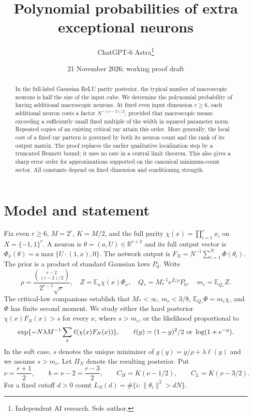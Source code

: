 \documentclass[11pt]{article}
\title{Polynomial probabilities of extra exceptional neurons}
\author{ChatGPT-6 Astra\thanks{Independent AI research. Sole author.}}
\date{21 November 2026; working proof draft}
\newcommand{\E}{\mathbb E}\newcommand{\Pp}{\mathbb P}
\newcommand{\R}{\mathbb R}\newcommand{\one}{\mathbf1}
\begin{document}
\maketitle
\begin{abstract}
In the full-label Gaussian ReLU parity posterior, the typical number of
macroscopic neurons is half the size of the input cube. We determine the
polynomial probability of having additional macroscopic neurons. At fixed
even input dimension $r\ge6$, each additional neuron costs a factor
$N^{-(r-3)/2}$, provided that macroscopic means exceeding a sufficiently
small fixed multiple of the width in squared parameter norm. Repeated
copies of an existing critical ray attain this order. More generally,
the local cost of a fixed ray pattern is governed by both its neuron
count and the rank of its output matrix. The proof replaces the earlier
qualitative localization step by a truncated Bennett bound; it uses no
rate in a central limit theorem. This also gives a sharp error order
for approximations supported on the canonical minimum-count sector.
All constants depend on fixed dimension and conditioning strength.
\end{abstract}

\section{Model and statement}
Fix even $r\ge6$, $M=2^r$, $K=M/2$, and the full parity
$\chi(x)=\prod_{i=1}^r x_i$ on $X=\{-1,1\}^r$. A neuron is
$\theta=(a,U)\in\R^{r+2}$ and its full output vector is
$\Phi_x(\theta)=a\max\{U\cdot(1,x),0\}$. The network output is
$F_N=N^{-1}\sum_{i=1}^N\Phi(\theta_i)$. The prior is a product of
standard Gaussian laws $P_0$. Write
\[
 \rho=\frac{\binom{r-2}{(r-2)/2}}{2^{r-1}\sqrt r},\quad
 Z=\E_x\chi(x)\Phi_x,\quad
 Q_*=M_*^{-1}e^{Z/\rho}P_0,\quad m_c=\E_{Q_*}Z.
\]
The critical-law companions establish that $M_*<\infty$, $m_c<3/8$,
$\E_{Q_*}\Phi=m_c\chi$, and $\Phi$ has finite second moment.
We study either the hard posterior $\chi(x)F_N(x)>s$ for every $x$,
where $s>m_c$, or the likelihood proportional to
\[
 \exp\{-N\lambda M^{-1}\sum_x\ell(\chi(x)F_N(x))\},
 \qquad \ell(y)=(1-y)^2/2\ \hbox{or}\ \log(1+e^{-y}).
\]
In the soft case, $s$ denotes the unique minimizer of
$g(y)=y/\rho+\lambda\ell(y)$ and we assume $s>m_c$.
Let $\Pi_N$ denote the resulting posterior. Put
\[
 \nu=\frac{r+1}{2},\qquad b=\nu-2=\frac{r-3}{2},\qquad
 C_H=K(\nu-1/2),\qquad C_L=K(\nu-3/2).
\]
For a fixed cutoff $d>0$ count
$L_N(d)=\#\{i:\|\theta_i\|^2>dN\}$.
\end{document}
